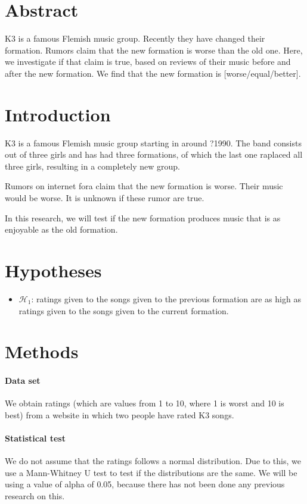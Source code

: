 \documentclass{article}
\begin{document}
\section{Abstract}

K3 is a famous Flemish music group.
Recently they have changed their formation.
Rumors claim that the new formation is worse
than the old one.
Here, we investigate if that claim is true,
based on reviews of their music before
and after the new formation.
We find that the new formation is 
[worse/equal/better].

\section{Introduction}

K3 is a famous Flemish music group
starting in around ?1990.
The band consists out of three girls
and has had three formations, of which
the last one raplaced all three girls,
resulting in a completely new group.

Rumors on internet fora claim that the new
formation is worse. Their music would be
worse. It is unknown if these rumor are true.

In this research, we will test if the new
formation produces music that is as enjoyable
as the old formation.

\section{Hypotheses}

\begin{itemize}
  \item $\mathcal{H}_1$: 
  ratings given to the songs given
  to the previous formation are as high
  as ratings given to the songs given to the
  current formation.
\end{itemize}

\section{Methods}

\paragraph{Data set}
We obtain ratings (which are values from
1 to 10, where 1 is worst and 10 is best) 
from a website in which two people
have rated K3 songs. 

\paragraph{Statistical test}
We do not assume that the 
ratings follows a normal distribution. Due to this,
we use a Mann-Whitney U test to test if
the distributions are the same.
We will be using a value of alpha of 0.05,
because there has not been done any previous
research on this.
\end{document}
